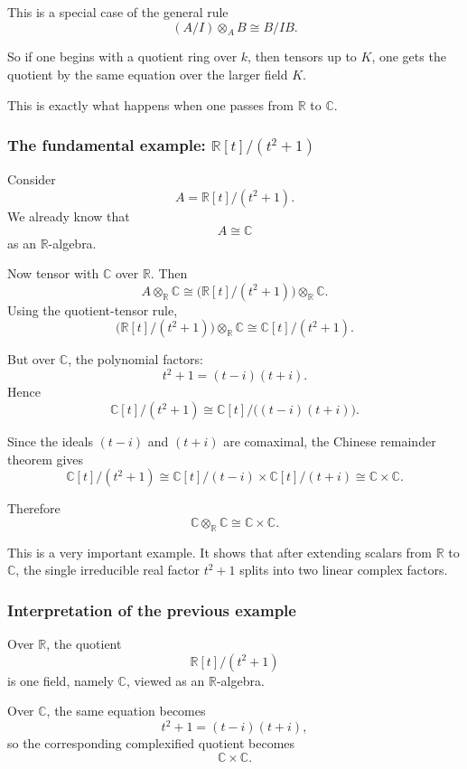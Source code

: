 \documentclass[12pt,a4paper]{article}
\theoremstyle{notespace}
\theoremstyle{definition}
\begin{document}
This is a special case of the general rule
\[
(A/I)\otimes_A B \cong B/IB.
\]

So if one begins with a quotient ring over \(k\), then tensors up to \(K\), one gets the quotient by the same equation over the larger field \(K\).

This is exactly what happens when one passes from \(\mathbb{R}\) to \(\mathbb{C}\).

\subsubsection{The fundamental example: \(\mathbb{R}[t]/(t^2+1)\)}

Consider
\[
A=\mathbb{R}[t]/(t^2+1).
\]
We already know that
\[
A\cong \mathbb{C}
\]
as an \(\mathbb{R}\)-algebra.

Now tensor with \(\mathbb{C}\) over \(\mathbb{R}\). Then
\[
A\otimes_{\mathbb{R}}\mathbb{C}
\cong
\bigl(\mathbb{R}[t]/(t^2+1)\bigr)\otimes_{\mathbb{R}}\mathbb{C}.
\]
Using the quotient-tensor rule,
\[
\bigl(\mathbb{R}[t]/(t^2+1)\bigr)\otimes_{\mathbb{R}}\mathbb{C}
\cong
\mathbb{C}[t]/(t^2+1).
\]

But over \(\mathbb{C}\), the polynomial factors:
\[
t^2+1=(t-i)(t+i).
\]
Hence
\[
\mathbb{C}[t]/(t^2+1)
\cong
\mathbb{C}[t]/\bigl((t-i)(t+i)\bigr).
\]

Since the ideals \((t-i)\) and \((t+i)\) are comaximal, the Chinese remainder theorem gives
\[
\mathbb{C}[t]/(t^2+1)\cong \mathbb{C}[t]/(t-i)\times \mathbb{C}[t]/(t+i)\cong \mathbb{C}\times \mathbb{C}.
\]

Therefore
\[
\mathbb{C}\otimes_{\mathbb{R}}\mathbb{C}\cong \mathbb{C}\times \mathbb{C}.
\]

This is a very important example.  
It shows that after extending scalars from \(\mathbb{R}\) to \(\mathbb{C}\), the single irreducible real factor \(t^2+1\) splits into two linear complex factors.

\subsubsection{Interpretation of the previous example}

Over \(\mathbb{R}\), the quotient
\[
\mathbb{R}[t]/(t^2+1)
\]
is one field, namely \(\mathbb{C}\), viewed as an \(\mathbb{R}\)-algebra.

Over \(\mathbb{C}\), the same equation becomes
\[
t^2+1=(t-i)(t+i),
\]
so the corresponding complexified quotient becomes
\[
\mathbb{C}\times \mathbb{C}.
\]
\end{document}
